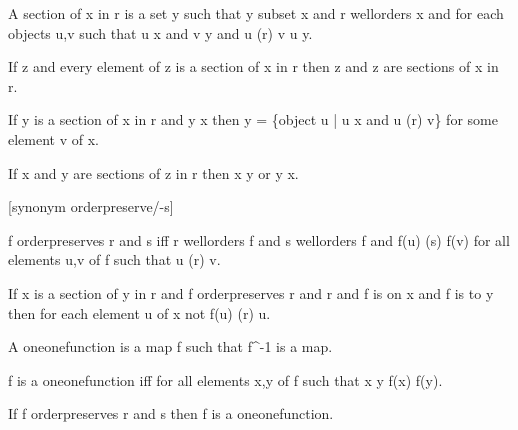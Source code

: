 \documentclass[a4paper,draft]{amsproc}
\begin{document}
\begin{forthel}
\begin{definition}[89]
A section of x in r is a set y such that y subset x and r wellorders x
and for each objects u,v such that u \in x and v \in y and u (r) v u \in y.
\end{definition}

\begin{theorem}[90]
If z  and every element of z is a section of x in r then \bigcup z and \bigcap z are sections of x in r.
\end{theorem}

\begin{theorem}[91]
If y is a section of x in r and y \neq x then
y = \{object u | u \in x and u (r) v\} for some element v of x.
\end{theorem}

\begin{theorem}[92]
If x and y are sections of z in r then x \subset y or y \subset x.
\end{theorem}

[synonym orderpreserve/-s]
\begin{definition}[93]
f orderpreserves r and s iff r wellorders \domain f and s wellorders \range f
and f(u) (s) f(v) for all elements u,v of \domain f such that u (r) v.
\end{definition}

\begin{theorem}[94]
If x is a section of y in r and f orderpreserves r and r and f is on x and f is to y
then for each element u of x not f(u) (r) u.
\end{theorem}

\begin{definition}[95]
A oneonefunction is a map f such that f^{-1} is a map.
\end{definition}

\begin{lemma}
f is a oneonefunction iff for all elements x,y of \domain f such that x \neq y f(x) \neq f(y).
\end{lemma}

\begin{theorem}[96a]
If f orderpreserves r and s then f is a oneonefunction.
\end{theorem}


\end{forthel}
\end{document}

